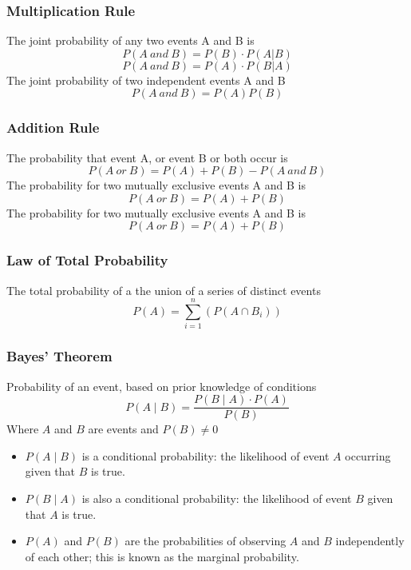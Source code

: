 \documentclass{article}
\begin{document}
\subsubsection{Multiplication Rule}
The joint probability of any two events A and B is
\begin{equation}
P(A\:and\:B) = P(B) \cdot P(A|B)
\end{equation}
\begin{equation}
P(A\:and\:B) = P(A) \cdot P(B|A)
\end{equation}
The joint probability of two independent events A and B
\begin{equation}
P(A\:and\:B) = P(A)P(B)
\end{equation}

\subsubsection{Addition Rule}
The probability that event A, or event B or both occur is
\begin{equation}
P(A\:or\:B) = P(A) + P(B) - P(A\:and\:B)
\end{equation}
The probability for two mutually exclusive events A and B is
\begin{equation}
P(A\:or\:B) = P(A) + P(B)
\end{equation}
The probability for two mutually exclusive events A and B is
\begin{equation}
P(A\:or\:B) = P(A) + P(B)
\end{equation}

\subsubsection{Law of Total Probability}
The total probability of a the union of a series of distinct events
\begin{equation}
P(A) = \sum\limits_{i=1}^n(P(A \cap B_i))
\end{equation}


\subsubsection{Bayes' Theorem}
Probability of an event, based on prior knowledge of conditions
\begin{equation}
P(A \mid B) = \frac{P(B \mid A) \cdot P(A)}{P(B)}
\end{equation}
Where $A$ and $B$ are events and $P(B) \neq 0$

\begin{itemize}
\item $P(A \mid B)$ is a conditional probability: the likelihood of event $A$ occurring given that $B$ is true.
\item $P(B \mid A)$ is also a conditional probability: the likelihood of event $B$ given that $A$ is true.
\item $P(A)$ and $P(B)$ are the probabilities of observing $A$ and $B$ independently of each other; this is known as the marginal probability.
\end{itemize}
\end{document}
